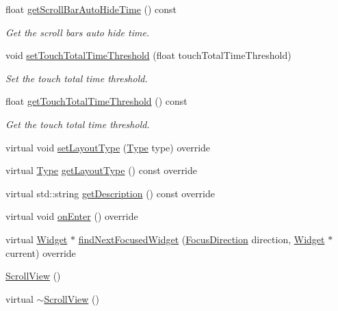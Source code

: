 \begin{DoxyCompactItemize}
float \hyperlink{classui_1_1ScrollView_a400f36f7795944486005668c0e350ebd}{get\+Scroll\+Bar\+Auto\+Hide\+Time} () const
\begin{DoxyCompactList}\small\item\em Get the scroll bar\textquotesingle{}s auto hide time. \end{DoxyCompactList}\item 
void \hyperlink{classui_1_1ScrollView_acf1cbcd7c4983d3b97c81dc89c95fe98}{set\+Touch\+Total\+Time\+Threshold} (float touch\+Total\+Time\+Threshold)
\begin{DoxyCompactList}\small\item\em Set the touch total time threshold. \end{DoxyCompactList}\item 
float \hyperlink{classui_1_1ScrollView_a842b04afdb3bf04ec3c936654d4ae024}{get\+Touch\+Total\+Time\+Threshold} () const
\begin{DoxyCompactList}\small\item\em Get the touch total time threshold. \end{DoxyCompactList}\item 
virtual void \hyperlink{classui_1_1ScrollView_a3dc215785981958746d0e12ef5ce5d92}{set\+Layout\+Type} (\hyperlink{classui_1_1Layout_aecabbc1592677eadd6757edc1df5b952}{Type} type) override
\item 
virtual \hyperlink{classui_1_1Layout_aecabbc1592677eadd6757edc1df5b952}{Type} \hyperlink{classui_1_1ScrollView_a437befb0a341d9f9c2278e3f119a1af7}{get\+Layout\+Type} () const override
\item 
virtual std\+::string \hyperlink{classui_1_1ScrollView_a3a808390a8d9162dbbf83d5211e87f2e}{get\+Description} () const override
\item 
virtual void \hyperlink{classui_1_1ScrollView_a1fb1c9ad9108d8c0102af82bfb7ef66d}{on\+Enter} () override
\item 
virtual \hyperlink{classui_1_1Widget}{Widget} $\ast$ \hyperlink{classui_1_1ScrollView_adda46d15b5742af6e64a96b23c3ca10a}{find\+Next\+Focused\+Widget} (\hyperlink{classui_1_1Widget_a8ae8e8fc793a04a87584205cd1e8a8a5}{Focus\+Direction} direction, \hyperlink{classui_1_1Widget}{Widget} $\ast$current) override
\item 
\hyperlink{classui_1_1ScrollView_a0a3dabbdb3e95a870cba7abdd3cdbfeb}{Scroll\+View} ()
\item 
virtual \hyperlink{classui_1_1ScrollView_a210861d8c390d358f58ddf2881456e85}{$\sim$\+Scroll\+View} ()
\item 

\end{DoxyCompactItemize}
